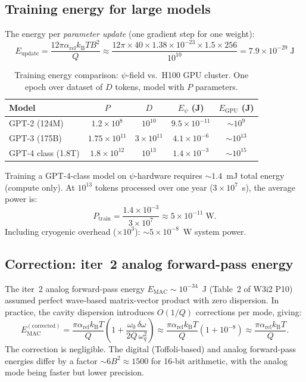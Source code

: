 \documentclass[11pt]{article}
\theoremstyle{definition}
\theoremstyle{remark}
\newcommand{\kB}{k_{\mathrm{B}}}
\newcommand{\arel}{\alpha_{\mathrm{rel}}}
\begin{document}
\subsection{Training energy for large models}

The energy per \emph{parameter update} (one gradient step for one weight):
\begin{equation}
\boxed{
E_{\mathrm{update}} = \frac{12\pi\arel\kB T B^2}{Q}
\approx \frac{12\pi\times40\times1.38\times10^{-23}\times1.5\times256}{10^{10}}
= 7.9\times10^{-29}\;\text{J}
}
\label{eq:per-param-update}
\end{equation}

\begin{table}[h]
\centering
\caption{Training energy comparison: $\psi$-field vs.\ H100 GPU cluster.
One epoch over dataset of $D$ tokens, model with $P$ parameters.}
\label{tab:training}
\begin{tabular}{@{}lcccc@{}}
\toprule
\textbf{Model} & $P$ & $D$ & $E_\psi$ (J) & $E_{\mathrm{GPU}}$ (J) \\
\midrule
GPT-2 (124M) & $1.2\times10^8$ & $10^{10}$ & $9.5\times10^{-11}$ & $\sim 10^{9}$ \\
GPT-3 (175B) & $1.75\times10^{11}$ & $3\times10^{11}$ & $4.1\times10^{-6}$ & $\sim 10^{13}$ \\
GPT-4 class (1.8T) & $1.8\times10^{12}$ & $10^{13}$ & $1.4\times10^{-3}$ & $\sim 10^{15}$ \\
\bottomrule
\end{tabular}
\end{table}

Training a GPT-4-class model on $\psi$-hardware requires $\sim 1.4$~mJ total
energy (compute only). At $10^{13}$ tokens processed over one year
($3\times10^7$~s), the average power is:
\begin{equation}
P_{\mathrm{train}} = \frac{1.4\times10^{-3}}{3\times10^7} \approx 5\times10^{-11}\;\text{W}.
\end{equation}
Including cryogenic overhead ($\times10^3$): $\sim 5\times10^{-8}$~W system power.

\subsection{Correction: iter~2 analog forward-pass energy}

The iter~2 analog forward-pass energy $E_{\mathrm{MAC}} \sim 10^{-34}$~J
(Table~2 of W3i2 P10) assumed perfect wave-based matrix-vector product
with zero dispersion. In practice, the cavity dispersion introduces
$O(1/Q)$ corrections per mode, giving:
\begin{equation}
E_{\mathrm{MAC}}^{(\mathrm{corrected})} = \frac{\pi\arel\kB T}{Q}
\left(1 + \frac{\omega_0\,\delta\omega}{2Q\,\omega_q^2}\right)
\approx \frac{\pi\arel\kB T}{Q}\left(1 + 10^{-8}\right)
\approx \frac{\pi\arel\kB T}{Q}.
\end{equation}
The correction is negligible. The digital (Toffoli-based) and analog
forward-pass energies differ by a factor $\sim 6B^2 \approx 1500$ for
16-bit arithmetic, with the analog mode being faster but lower precision.
\end{document}
